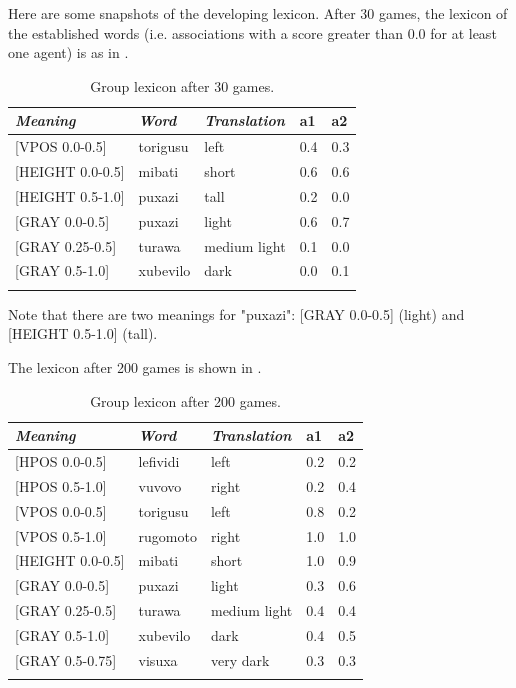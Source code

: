 Here are some snapshots of the developing lexicon. 
After 30 games, the lexicon of the established
words (i.e. associations with a score greater 
than 0.0 for at least one agent) is as in . 
\begin{table}
\begin{center}
\begin{tabular}{ l  l  l  l  l }
\lsptoprule
{\itshape Meaning}&{\itshape Word}&{\itshape Translation} & {\bfshape  a1}&{\bfshape  a2} \\ \midrule
{}[VPOS 0.0-0.5] &torigusu&left&0.4&0.3\\ 
{}[HEIGHT 0.0-0.5]&mibati&short &0.6&0.6\\ 
{}[HEIGHT 0.5-1.0]&puxazi&tall &0.2&0.0\\ 
{}[GRAY 0.0-0.5]& puxazi&light &0.6&0.7\\ 
{}[GRAY 0.25-0.5]&turawa&medium light&0.1&0.0\\ 
{}[GRAY 0.5-1.0]& xubevilo&dark &0.0&0.1\\ 
\lspbottomrule
\end{tabular}
\caption{\label{tab:after30} Group lexicon after 30 games.}
\end{center}
\end{table}
Note that there are two meanings for "puxazi": 
{}[GRAY 0.0-0.5] (light) and [HEIGHT 0.5-1.0] (tall). 

The lexicon after 200 games is shown in . 
\begin{table}
\begin{center}
\begin{tabular}{ l  l  l  l  l }
\lsptoprule
{\itshape Meaning}&{\itshape Word}&{\itshape Translation} & {\bfshape  a1}&{\bfshape  a2} \\ \midrule
{}[HPOS 0.0-0.5] &lefividi&left&0.2&0.2\\ 
{}[HPOS 0.5-1.0] &vuvovo&right&0.2&0.4\\ 
{}[VPOS 0.0-0.5] &torigusu&left&0.8&0.2\\ 
{}[VPOS 0.5-1.0] &rugomoto&right&1.0&1.0\\ 
{}[HEIGHT 0.0-0.5]&mibati&short &1.0&0.9\\ 
{}[GRAY 0.0-0.5]& puxazi&light &0.3&0.6\\ 
{}[GRAY 0.25-0.5]&turawa&medium light&0.4&0.4\\ 
{}[GRAY 0.5-1.0]& xubevilo&dark &0.4&0.5\\ 
{}[GRAY 0.5-0.75]& visuxa&very dark &0.3&0.3\\ 
\lspbottomrule
\end{tabular}
\caption{\label{tab:after200} Group lexicon after 200 games.}
\end{center}
\end{table}

